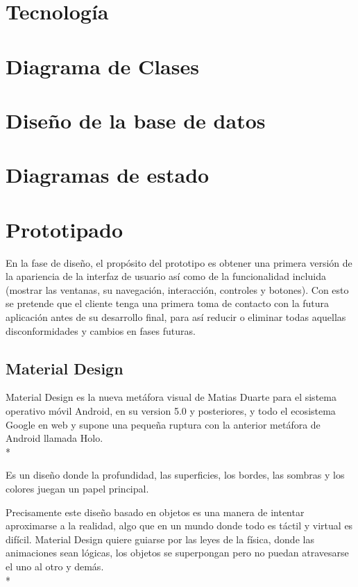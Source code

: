 \documentclass[../pfc.tex]{subfiles}
\begin{document}
	
	\section{Tecnología}
	
	\section{Diagrama de Clases}
	
	\section{Diseño de la base de datos}
	
	\section{Diagramas de estado}
	
	\section{Prototipado}
	
	En la fase de diseño, el propósito del prototipo es obtener una primera versión de la apariencia de la interfaz de usuario así como de la funcionalidad incluida (mostrar las ventanas, su navegación, interacción, controles y botones). Con esto se pretende que el cliente tenga una primera toma de contacto con la futura aplicación antes de su desarrollo final, para así reducir o eliminar todas aquellas disconformidades y cambios en fases futuras.
	
		\subsection{Material Design}
		Material Design es la nueva metáfora visual de Matias Duarte para el sistema operativo móvil Android, en su version 5.0 y posteriores, y todo el ecosistema Google en web y supone una pequeña ruptura con la anterior metáfora de Android llamada Holo. \\*
		
		Es un diseño donde la profundidad, las superficies, los bordes, las sombras y los colores juegan un papel principal.
		
		Precisamente este diseño basado en objetos es una manera de intentar aproximarse a la realidad, algo que en un mundo donde todo es táctil y virtual es difícil. Material Design quiere guiarse por las leyes de la física, donde las animaciones sean lógicas, los objetos se superpongan pero no puedan atravesarse el uno al otro y demás.\\*
		
\end{document}
